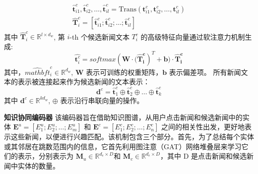 \documentclass[withoutpreface,bwprint]{cumcmthesis} %
\begin{document}
	\begin{equation}\label{eta}
	\begin{split}
	\hat{\mathbf{t}} _{i1}^{c}, \hat{\mathbf{t}}_{i2}^{c}, \ldots, \hat{\mathbf{t}}_{il}^{c} =\mathrm{Trans} (\mathbf{t}^c_{i1},\mathbf{t}^c_{i2}, \ldots, \mathbf{t}^c_{il})\\
	\hat{\mathbf{T}}_i^c = [\hat{\mathbf{t}}_{i1}^{c}; \hat{\mathbf{t}}_{i2}^{c}; \ldots; \hat{\mathbf{t}}_{il}^{c}]
	\end{split}
	\end{equation}\label{eta}
	其中 $\hat{\mathbf{T}}^{c}_i \in \mathbb{R}^{l \times d_w}$, 
	第 $i$-th 个候选新闻文本 $T_i^c$ 的高级特征向量通过软注意力机制生成: 
	\begin{equation}
	\hat{\mathbf{t}^c_i} = softmax( \mathbf{W} \cdot \mathbf{(\hat{\mathbf{T}}^c_i})^{T} + \mathbf{b}) \cdot \mathbf{\hat{\mathbf{T}}^c_i}
	\end{equation}
	其中，$\hat{mathbf{t}}^c_i \in \mathbb{R}^{d_w}$, $\mathbf{W}$ 表示可训练的权重矩阵，$\mathbf{b}$ 表示偏差项。
	所有新闻文本的表示被连接起来作为候选新闻的文本表示：
	\begin{equation}\label{eta}
	\mathbf{d}^c= \hat{\mathbf{t}}_1^c \oplus \hat{\mathbf{t}}_2^c \oplus \ldots \oplus \hat{\mathbf{t}}_k^c
	\end{equation}\label{eta}
	其中 $\mathbf{d}^c \in \mathbb{R}^{kd_w}$, $\oplus$ 表示沿行串联向量的操作。\par
	\textbf{知识协同编码器 }
	该编码器旨在借助知识图谱，从用户点击新闻和候选新闻中的实体 $\mathbf{E}^{u} =[E^u_1;E^u_2;\dots;E^u_m] $ 和 $\mathbf{E}^{c} = [E^c_1;E^c_2;\dots;E^c_n] $ 之间的相关性出发，更好地表示这些新闻，以便进行兴趣匹配。该机制包含三个部分。首先，为了总结每个实体或其邻居在跳数范围内的信息，它首先利用图注意（GAT）网络堆叠层来学习它们的表示，分别表示为 $\mathbf{M}_u \in \mathbb{R}^{d_e \times D}$和 $\mathbf{M}_c \in \mathbb{R}^{d_e \times D}$，其中 D 是点击新闻和候选新闻中实体的数量。
	
\end{document}
